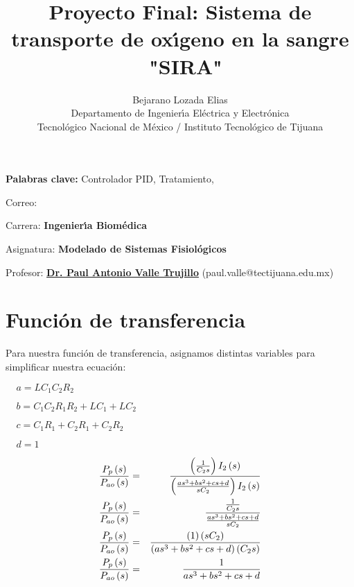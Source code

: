 \documentclass[letterpaper,11pt]{article}
\begin{document}
\title{Proyecto Final: Sistema de transporte de ox\'{\i}geno en la sangre \
"SIRA"}
\author{Bejarano Lozada Elias \\
Departamento de Ingenier\'{\i}a El\'{e}ctrica y Electr\'{o}nica\\
Tecnol\'{o}gico Nacional de M\'{e}xico / Instituto Tecnol\'{o}gico de Tijuana%
}
\maketitle

\noindent \noindent \textbf{Palabras clave: }Controlador PID, Tratamiento, 

Correo:

\noindent \noindent Carrera: \textbf{Ingenier\'{\i}a Biom\'{e}dica}

\noindent Asignatura: \textbf{Modelado de Sistemas Fisiol\'{o}gicos}

\noindent Profesor: \href{https://biomath.xyz/}{\textbf{Dr. Paul Antonio
Valle Trujillo}} (paul.valle@tectijuana.edu.mx)

\section{Funci\'{o}n de transferencia}

Para nuestra funci\'{o}n de transferencia, asignamos distintas variables
para simplificar nuestra ecuaci\'{o}n:

$\ \ \ \ \ a=LC_{1}C_{2}R_{2}$

$\ \ \ \ \ b=C_{1}C_{2}R_{1}R_{2}+LC_{1}+LC_{2}$

$\ \ \ \ \ c=C_{1}R_{1}+C_{2}R_{1}+C_{2}R_{2}$

$\ \ \ \ \ d=1$

\begin{eqnarray*}
\frac{P_{p}\left( s\right) }{P_{ao}\left( s\right) } &=&\frac{\left( \frac{1%
}{C_{2}s}\right) I_{2}\left( s\right) }{\left( \frac{as^{3}+bs^{2}+cs+d}{%
sC_{2}}\right) I_{2}\left( s\right) } \\
\frac{P_{p}\left( s\right) }{P_{ao}\left( s\right) } &=&\frac{\frac{1}{C_{2}s%
}}{\frac{as^{3}+bs^{2}+cs+d}{sC_{2}}} \\
\frac{P_{p}\left( s\right) }{P_{ao}\left( s\right) } &=&\frac{\left(
1\right) \left( sC_{2}\right) }{\left( as^{3}+bs^{2}+cs+d\right) \left(
C_{2}s\right) } \\
\frac{P_{p}\left( s\right) }{P_{ao}\left( s\right) } &=&\frac{1}{%
as^{3}+bs^{2}+cs+d}
\end{eqnarray*}
\end{document}
